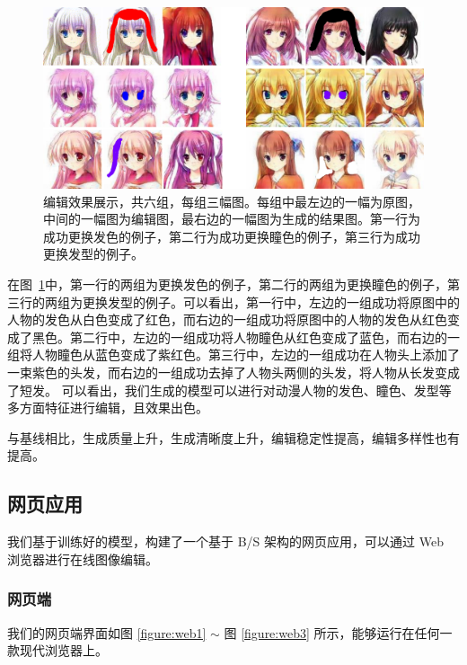 \documentclass[a4paper,12pt,UTF8]{ctexart}
\newcommand{\kai}{\CJKfamily{zhkai}}	%
\begin{document}
\begin{figure}[H]
  \centering
  \includegraphics[width=0.9\linewidth]{figs/pic.pdf}
  \caption{\kai 编辑效果展示，共六组，每组三幅图。每组中最左边的一幅为原图，中间的一幅图为编辑图，最右边的一幅图为生成的结果图。第一行为成功更换发色的例子，第二行为成功更换瞳色的例子，第三行为成功更换发型的例子。}
  \label{fig:pic}
\end{figure}

在图~\ref{fig:pic}中，第一行的两组为更换发色的例子，第二行的两组为更换瞳色的例子，第三行的两组为更换发型的例子。可以看出，第一行中，左边的一组成功将原图中的人物的发色从白色变成了红色，而右边的一组成功将原图中的人物的发色从红色变成了黑色。第二行中，左边的一组成功将人物瞳色从红色变成了蓝色，而右边的一组将人物瞳色从蓝色变成了紫红色。第三行中，左边的一组成功在人物头上添加了一束紫色的头发，而右边的一组成功去掉了人物头两侧的头发，将人物从长发变成了短发。
可以看出，我们生成的模型可以进行对动漫人物的发色、瞳色、发型等多方面特征进行编辑，且效果出色。

与基线相比，生成质量上升，生成清晰度上升，编辑稳定性提高，编辑多样性也有提高。

\subsection{网页应用}

我们基于训练好的模型，构建了一个基于 B/S 架构的网页应用，可以通过 Web 浏览器进行在线图像编辑。

\subsubsection{网页端}
我们的网页端界面如图 \ref{figure:web1} $\sim$ 图 \ref{figure:web3}  所示，能够运行在任何一款现代浏览器上。
\end{document}
